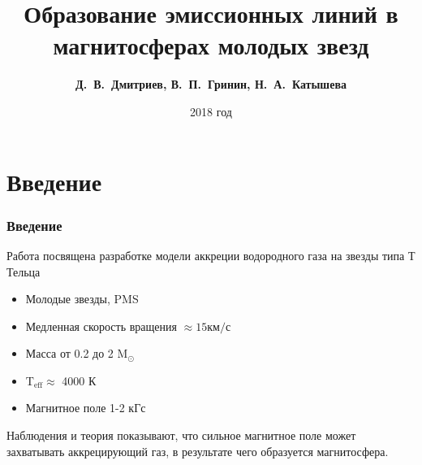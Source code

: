 \documentclass{beamer}
\begin{document}
\title[]{Образование эмиссионных линий в магнитосферах молодых звезд}
\author[]{\textbf{Д.~В.~Дмитриев, В.~П.~Гринин, Н.~А.~Катышева}}
\date{2018 год}

\frame[noframenumbering]{\titlepage}

\section{Введение}
\begin{frame}


\frametitle{Введение}
Работа посвящена разработке модели аккреции водородного газа на звезды типа Т Тельца
\begin{itemize}
\item Молодые звезды, PMS
\item Медленная скорость вращения $\approx 15 \text{км/с}$
\item Масса от 0.2 до 2 $\text{M}_\odot$
\item T$_\text{eff} \approx $ 4000 К  
\item Магнитное поле 1-2 кГс
\end{itemize}
Наблюдения и теория показывают, что сильное магнитное поле может захватывать аккрецирующий газ, в результате чего образуется магнитосфера.
\end{frame}

\end{document}
